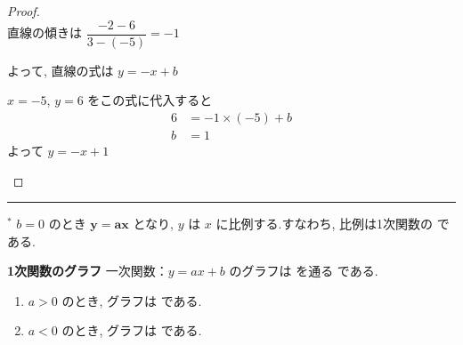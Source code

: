\begin{proof}\mbox{}\\
    直線の傾きは $\dfrac{-2 - 6}{3 - (-5)} = -1$

    \vspace{0.5em}
    よって, 直線の式は $y = -x + b$

    \begin{hiddenanswer}
        $x = -5$, $y = 6$ をこの式に代入すると
        \begin{align*}
            6 &= -1 \times (-5) + b \\
            b &= 1
        \end{align*}
        よって $y = -x + 1$
    \end{hiddenanswer}
\end{proof}

\vfill
\noindent\rule{\textwidth}{0.4pt}

\vspace{0.2em}
\noindent
$^{*}$ $b = 0$ のとき $\bm{y = ax}$ となり, $y$ は $x$ に比例する.すなわち, 比例は1次関数の  である.

\newpage

\begin{theorembox}{\textbf{1次関数のグラフ}}
    一次関数：$y = ax + b$ のグラフは  を通る  である.
    \begin{enumerate}
        \item $a > 0$ のとき, グラフは  である.
        \item $a < 0$ のとき, グラフは  である.
    \end{enumerate}
\end{theorembox}


